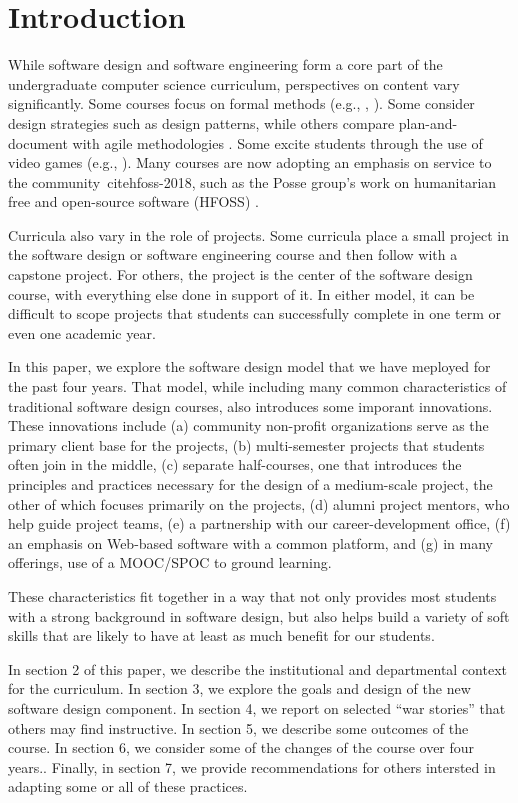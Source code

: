 
\section{Introduction}

While software design and software engineering form a core part of
the undergraduate computer science curriculum, perspectives on 
content vary significantly.  Some courses
focus on formal methods (e.g., \cite{liu-2009}, \cite{garcia-2014}).
Some consider design strategies such as design patterns, while others
compare plan-and-document with agile methodologies
\cite{gestwicki-2018}.  Some excite students through the use of
video games (e.g., \cite{wolz-2007}).  Many courses are now adopting
an emphasis on service to the community~cite{hfoss-2018}, 
such as the Posse group's work on
humanitarian free and open-source software (HFOSS) \cite{posse-2018}.

Curricula also vary in the role of projects.  Some curricula place
a small project in the software design or software engineering
course and then follow with a capstone project.  For others,
the project is the center of the software design course, with
everything else done in support of it. In either model, it can be difficult to 
scope projects that students can successfully complete 
in one term or even one academic year.

In this paper, we explore the software design model that we have
meployed for the past four years.  That model, while including many
common characteristics of traditional software design courses, also
introduces some imporant innovations.  These innovations include
(a) community non-profit organizations serve as the primary client
base for the projects,
(b) multi-semester projects that students often join in the middle,
(c) separate half-courses, one that introduces
the principles and practices necessary for the design of a medium-scale
project, the other of which focuses primarily on the projects, 
(d) alumni project mentors, who help guide project teams, 
(e) a partnership with our career-development office, 
(f) an emphasis on Web-based software with a common platform, and 
(g) in many offerings, use of a MOOC/SPOC to ground learning.

These characteristics fit together in a way that not only provides
most students with a strong background in software design, but also
helps build a variety of soft skills that are likely to have at
least as much benefit for our students.

In section 2 of this paper, we describe the institutional and
departmental context for the curriculum.  In section 3, we explore
the goals and design of the new software design component.  In
section 4, we report on selected ``war stories'' that others may
find instructive.  In section 5, we describe some outcomes of the
course.  In section 6, we consider some of the changes of the course
over four years..  Finally, in section 7, we provide recommendations
for others intersted in adapting some or all of these practices.


